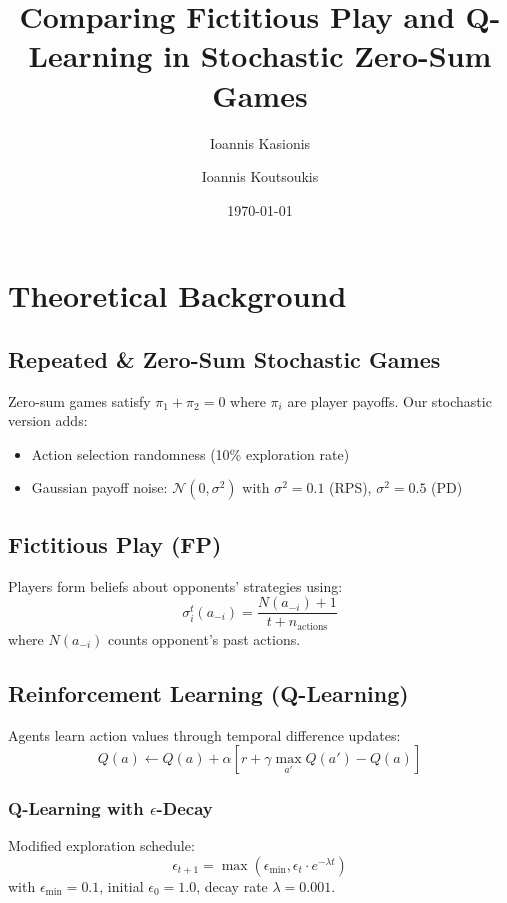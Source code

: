 \documentclass{article}
\title{Comparing Fictitious Play and Q-Learning in Stochastic Zero-Sum Games}
\author{Ioannis Kasionis \and Ioannis Koutsoukis}
\date{\today}
\begin{document}
\maketitle
\tableofcontents
\pagebreak

\section{Theoretical Background}
\subsection{Repeated \& Zero-Sum Stochastic Games}
Zero-sum games satisfy $\pi_1 + \pi_2 = 0$ where $\pi_i$ are player payoffs. Our stochastic version adds:
\begin{itemize}
\item Action selection randomness (10\% exploration rate)
\item Gaussian payoff noise: $\mathcal{N}(0,\sigma^2)$ with $\sigma^2=0.1$ (RPS), $\sigma^2=0.5$ (PD)
\end{itemize}

\subsection{Fictitious Play (FP)}
Players form beliefs about opponents' strategies using:
\begin{equation}
\sigma_i^t(a_{-i}) = \frac{N(a_{-i}) + 1}{t + n_{\text{actions}}}
\end{equation}
where $N(a_{-i})$ counts opponent's past actions.

\subsection{Reinforcement Learning (Q-Learning)}
Agents learn action values through temporal difference updates:
\begin{equation}
Q(a) \leftarrow Q(a) + \alpha\left[r + \gamma \max_{a'}Q(a') - Q(a)\right]
\end{equation}

\subsubsection{Q-Learning with $\epsilon$-Decay}
Modified exploration schedule:
\begin{equation}
\epsilon_{t+1} = \max\left(\epsilon_{\min}, \epsilon_t \cdot e^{-\lambda t}\right)
\end{equation}
with $\epsilon_{\min}=0.1$, initial $\epsilon_0=1.0$, decay rate $\lambda=0.001$.
\end{document}
